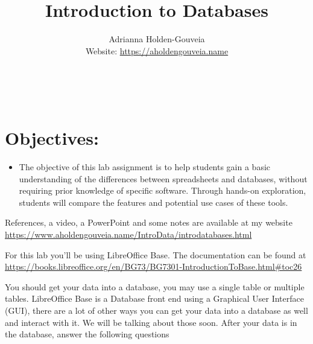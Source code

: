 \documentclass[12pt]{article}
\title{Introduction to Databases}
\author{
        Adrianna Holden-Gouveia \\
        Website: \url{https://aholdengouveia.name}\\ 
        \date{\vspace{-5ex}}
        \faLinkedin{: aholdengouveia} \\
        \faGithub {: aholdengouveia} \\
        }
\begin{document}
    

\maketitle


\section*{Objectives:}
\begin{itemize}
    \item The objective of this lab assignment is to help students gain a basic understanding of the differences between spreadsheets and databases, without requiring prior knowledge of specific software. Through hands-on exploration, students will compare the features and potential use cases of these tools.
\end{itemize}


References, a video, a PowerPoint and some notes are available at my website
\url {https://www.aholdengouveia.name/IntroData/introdatabases.html}

For this lab you'll be using LibreOffice Base.  The documentation can be found at \url{https://books.libreoffice.org/en/BG73/BG7301-IntroductionToBase.html#toc26}

You should get your data into a database, you may use a single table or multiple tables. LibreOffice Base is a Database front end using a Graphical User Interface (GUI), there are a lot of other ways you can get your data into a database as well and interact with it. We will be talking about those soon. After your data is in the database, answer the following questions


\end{document}
